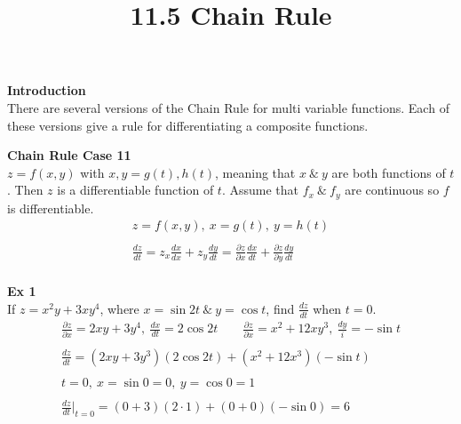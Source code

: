 \documentclass{article}
\title{11.5 Chain Rule}
\begin{document}
  \maketitle
  \textbf{Introduction}\\
  There are several versions of the Chain Rule for multi variable functions. Each of these versions give a rule for differentiating a composite functions.

  \textbf{Chain Rule Case 11}\\
  $ z=f(x,y) $ with $ x,y =g(t),h(t) $, meaning that $ x ~\&~ y $ are both functions of $ t $. Then $ z $ is a differentiable function of $ t $. Assume that $ f_{x} ~\&~ f_{y}   $ are continuous so $ f $ is differentiable.  
  \[
    \begin{gathered}
    z=f(x,y),~x=g(t),~y=h(t)\\
    ~\\
    \frac{dz}{dt} = z_{x} \frac{dx}{dx} + z_{y}\frac{dy}{dt} =  \frac{\partial z}{\partial x} \frac{dx}{dt}+\frac{\partial z}{\partial y} \frac{dy}{dt} 
    ~\\
    \end{gathered}
  \]

  \textbf{Ex 1}\\
  If $ z=x^{2}y+3xy^{4} $, where $ x=\sin{2t} ~\&~ y=\cos{t}$, find $ \frac{dz}{dt} $ when $ t=0 $.
  \[
    \begin{gathered}
    \frac{\partial z}{\partial x} = 2xy+3y^{4},~\frac{dx}{dt} =2\cos{2t} \qquad \frac{\partial z}{\partial x}=x^{2}+12xy^{3},~\frac{dy}{i}=-\sin{t}\\
    ~\\
    \frac{dz}{dt} = (2xy+3y^{3} )(2\cos{2t})+(x^{2}+12x^{3} )(-\sin{t})\\
    ~\\
    t=0,~x=\sin{0}=0,~y=\cos{0}=1\\
    ~\\
  \frac{dz}{dt} |_{t=0} =(0+3)(2\cdot 1)+(0+0)(-\sin{0})=\boxed{6}
    \end{gathered}
  \]
\end{document}
